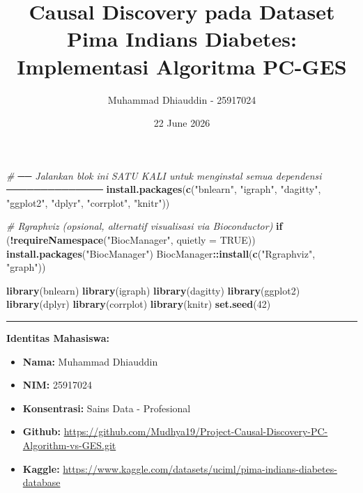 \documentclass[
  11pt,
]{article}
\title{Causal Discovery pada Dataset Pima Indians Diabetes: Implementasi
Algoritma PC-GES}
\author{Muhammad Dhiauddin - 25917024}
\date{22 June 2026}
\newenvironment{Shaded}{\begin{snugshade}}{\end{snugshade}}
\newcommand{\AttributeTok}[1]{\textcolor[rgb]{0.13,0.29,0.53}{#1}}
\newcommand{\CommentTok}[1]{\textcolor[rgb]{0.56,0.35,0.01}{\textit{#1}}}
\newcommand{\ConstantTok}[1]{\textcolor[rgb]{0.56,0.35,0.01}{#1}}
\newcommand{\ControlFlowTok}[1]{\textcolor[rgb]{0.13,0.29,0.53}{\textbf{#1}}}
\newcommand{\DecValTok}[1]{\textcolor[rgb]{0.00,0.00,0.81}{#1}}
\newcommand{\FunctionTok}[1]{\textcolor[rgb]{0.13,0.29,0.53}{\textbf{#1}}}
\newcommand{\NormalTok}[1]{#1}
\newcommand{\SpecialCharTok}[1]{\textcolor[rgb]{0.81,0.36,0.00}{\textbf{#1}}}
\newcommand{\StringTok}[1]{\textcolor[rgb]{0.31,0.60,0.02}{#1}}
\providecommand{\tightlist}{%
  \setlength{\itemsep}{0pt}\setlength{\parskip}{0pt}}
\begin{document}
\maketitle

{
\setcounter{tocdepth}{3}
\tableofcontents
}
\begin{Shaded}
\begin{Highlighting}[]
\CommentTok{\# ── Jalankan blok ini SATU KALI untuk menginstal semua dependensi ──────────────}
\FunctionTok{install.packages}\NormalTok{(}\FunctionTok{c}\NormalTok{(}\StringTok{"bnlearn"}\NormalTok{, }\StringTok{"igraph"}\NormalTok{, }\StringTok{"dagitty"}\NormalTok{,}
                   \StringTok{"ggplot2"}\NormalTok{, }\StringTok{"dplyr"}\NormalTok{, }\StringTok{"corrplot"}\NormalTok{, }\StringTok{"knitr"}\NormalTok{))}

\CommentTok{\# Rgraphviz (opsional, alternatif visualisasi via Bioconductor)}
\ControlFlowTok{if}\NormalTok{ (}\SpecialCharTok{!}\FunctionTok{requireNamespace}\NormalTok{(}\StringTok{"BiocManager"}\NormalTok{, }\AttributeTok{quietly =} \ConstantTok{TRUE}\NormalTok{))}
  \FunctionTok{install.packages}\NormalTok{(}\StringTok{"BiocManager"}\NormalTok{)}
\NormalTok{BiocManager}\SpecialCharTok{::}\FunctionTok{install}\NormalTok{(}\FunctionTok{c}\NormalTok{(}\StringTok{"Rgraphviz"}\NormalTok{, }\StringTok{"graph"}\NormalTok{))}
\end{Highlighting}
\end{Shaded}

\begin{Shaded}
\begin{Highlighting}[]
\FunctionTok{library}\NormalTok{(bnlearn)}
\FunctionTok{library}\NormalTok{(igraph)}
\FunctionTok{library}\NormalTok{(dagitty)}
\FunctionTok{library}\NormalTok{(ggplot2)}
\FunctionTok{library}\NormalTok{(dplyr)}
\FunctionTok{library}\NormalTok{(corrplot)}
\FunctionTok{library}\NormalTok{(knitr)}
\FunctionTok{set.seed}\NormalTok{(}\DecValTok{42}\NormalTok{)}
\end{Highlighting}
\end{Shaded}

\begin{center}\rule{0.5\linewidth}{0.5pt}\end{center}

\textbf{Identitas Mahasiswa:}

\begin{itemize}
\tightlist
\item
  \textbf{Nama:} Muhammad Dhiauddin
\item
  \textbf{NIM:} 25917024
\item
  \textbf{Konsentrasi:} Sains Data - Profesional
\item
  \textbf{Github:}
  \url{https://github.com/Mudhya19/Project-Causal-Discovery-PC-Algorithm-vs-GES.git}
\item
  \textbf{Kaggle:}
  \url{https://www.kaggle.com/datasets/uciml/pima-indians-diabetes-database}
\end{itemize}
\end{document}
